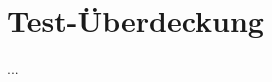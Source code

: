 \documentclass[../implementierung.tex]{subfiles}
\begin{document}
\section{Test-Überdeckung}
...
\end{document}
